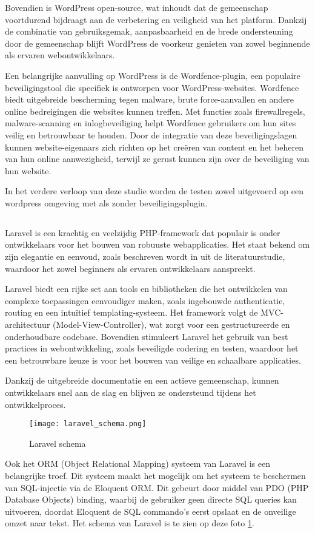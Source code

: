 Bovendien is WordPress open-source, wat inhoudt dat de 
gemeenschap voortdurend bijdraagt aan de verbetering en veiligheid van het platform. Dankzij de combinatie van gebruiksgemak, 
aanpasbaarheid en de brede ondersteuning door de gemeenschap blijft WordPress de voorkeur genieten van zowel beginnende als 
ervaren webontwikkelaars.

Een belangrijke aanvulling op WordPress is de Wordfence-plugin, een populaire beveiligingstool die specifiek is ontworpen 
voor WordPress-websites. Wordfence biedt uitgebreide bescherming tegen malware, brute force-aanvallen en andere online 
bedreigingen die websites kunnen treffen. Met functies zoals firewallregels, malware-scanning en inlogbeveiliging helpt 
Wordfence gebruikers om hun sites veilig en betrouwbaar te houden. Door de integratie van deze beveiligingslagen kunnen 
website-eigenaars zich richten op het creëren van content en het beheren van hun online aanwezigheid, terwijl ze gerust 
kunnen zijn over de beveiliging van hun website.

In het verdere verloop van deze studie worden de testen zowel uitgevoerd op een wordpress omgeving met als zonder 
beveiligingsplugin.

\subsection{}
Laravel is een krachtig en veelzijdig PHP-framework dat populair is onder ontwikkelaars voor het bouwen van robuuste 
webapplicaties. Het staat bekend om zijn elegantie en eenvoud, zoals beschreven wordt in  
uit de literatuurstudie, waardoor het zowel beginners als ervaren ontwikkelaars aanspreekt. 

Laravel biedt een rijke set aan tools en bibliotheken die het ontwikkelen van complexe toepassingen eenvoudiger 
maken, zoals ingebouwde authenticatie, routing en een intuïtief templating-systeem. Het framework volgt de MVC-architectuur 
(Model-View-Controller), wat zorgt voor een gestructureerde en onderhoudbare codebase. Bovendien stimuleert Laravel het 
gebruik van best practices in webontwikkeling, zoals beveiligde codering en testen, waardoor het een betrouwbare keuze is 
voor het bouwen van veilige en schaalbare applicaties. 

Dankzij de uitgebreide documentatie en een actieve gemeenschap, kunnen 
ontwikkelaars snel aan de slag en blijven ze ondersteund tijdens het ontwikkelproces.

\begin{figure}
    \centering
    \texttt{[image: laravel\_schema.png]}
    \caption[Laravel schema]{Laravel schema}
    \label{fig:laravel_schema}
\end{figure}

Ook het ORM (Object Relational Mapping) systeem van Laravel is een belangrijke troef. Dit systeem maakt het mogelijk om 
het systeem te beschermen van SQL-injectie via de Eloquent ORM. Dit gebeurt door middel van PDO (PHP Database Objects) binding, waarbij de
gebruiker geen directe SQL queries kan uitvoeren, doordat Eloquent de SQL commando's eerst opslaat en de onveilige omzet 
naar tekst. Het schema van Laravel is te zien op deze foto \ref{fig:laravel_schema}.
